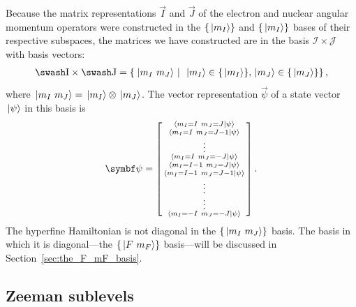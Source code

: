 Because the matrix representations $\vec I$ and $\vec J$ of the electron and nuclear angular momentum operators were constructed in the $\{\ket{m_I}\}$ and $\{\ket{m_I}\}$ bases of their respective subspaces, the matrices we have constructed are in the basis $\mathcal{I}\times\mathcal{J}$ with basis vectors:
\begin{align}
\mathcal{I}\times\mathcal{J} = \left\{\left. \ket{m_I\ m_J} \ \right| \ \ket{m_I} \in \{\ket{m_I}\}, \ket{m_J} \in \{\ket{m_J}\}\right\},
\end{align}
where $\ket{m_I\ m_J} = \ket{m_I} \otimes \ket{m_J}$. The vector representation $\vec\psi$ of a state vector $\ket{\psi}$ in this basis is
\begin{align}
\vec \psi = \left[\begin{smallmatrix}
\braket{m_I=I\ m_J=J}{\psi}\\
\braket{m_I=I\ m_J=J-1}{\psi}\\
\vdots\\
\braket{m_I=I\ m_J=-J}{\psi}\\
\braket{m_I=I-1\ m_J=J}{\psi}\\
\braket{m_I=I-1\ m_J=J-1}{\psi}\\
\vdots\\
\vdots\\
\braket{m_I=-I\ m_J=-J}{\psi}\\
\end{smallmatrix}\right].
\end{align}
The hyperfine Hamiltonian is not diagonal in the $\{\ket{m_I\ m_J}\}$ basis. The basis in which it is diagonal---the $\{\ket{F\ m_F}\}$ basis---will be discussed in Section~\ref{sec:the_F_mF_basis}.

\subsection{Zeeman sublevels}\label{sec:zeeman_sublevels}

